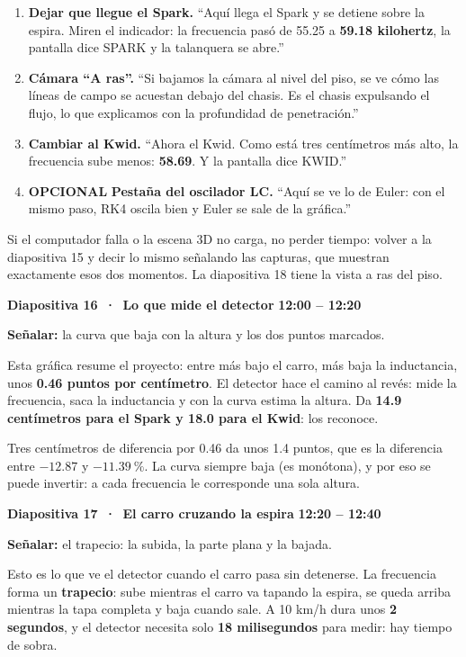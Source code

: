 \documentclass[11pt,a4paper]{article}
\newcommand{\diapo}[3]{%
  \par\vspace{8pt}
  {\large\bfseries Diapositiva #1 \,·\, #2}\hfill{\normalsize\bfseries\color{AzulIcesi} #3}\par
  \vspace{1pt}}
\newcommand{\senala}[1]{{\small\color{AzulIcesi}\textbf{Señalar:} #1}\par}
\begin{document}
\begin{enumerate}[leftmargin=1.4em, itemsep=3pt]
 \item \textbf{Dejar que llegue el Spark.} ``Aquí llega el Spark y se detiene sobre la espira. Miren el indicador:
       la frecuencia pasó de 55.25 a \textbf{59.18 kilohertz}, la pantalla dice SPARK y la talanquera se abre.''
 \item \textbf{Cámara ``A ras''.} ``Si bajamos la cámara al nivel del piso, se ve cómo las líneas de campo se
       acuestan debajo del chasis. Es el chasis expulsando el flujo, lo que explicamos con la profundidad de
       penetración.''
 \item \textbf{Cambiar al Kwid.} ``Ahora el Kwid. Como está tres centímetros más alto, la frecuencia sube menos:
       \textbf{58.69}. Y la pantalla dice KWID.''
 \item {\color{VerdeIcesi}\scriptsize\bfseries OPCIONAL} \textbf{Pestaña del oscilador LC.} ``Aquí se ve lo de
       Euler: con el mismo paso, RK4 oscila bien y Euler se sale de la gráfica.''
\end{enumerate}

\begin{nota}[Plan B]
Si el computador falla o la escena 3D no carga, no perder tiempo: volver a la diapositiva 15 y decir lo mismo
señalando las capturas, que muestran exactamente esos dos momentos. La diapositiva 18 tiene la vista a ras del piso.
\end{nota}

\diapo{16}{Lo que mide el detector}{12:00 -- 12:20}
\senala{la curva que baja con la altura y los dos puntos marcados.}

Esta gráfica resume el proyecto: entre más bajo el carro, más baja la inductancia, unos \textbf{0.46 puntos por
centímetro}. El detector hace el camino al revés: mide la frecuencia, saca la inductancia y con la curva estima la
altura. Da
\textbf{14.9 centímetros para el Spark y 18.0 para el Kwid}: los reconoce.

\begin{nota}
Tres centímetros de diferencia por 0.46 da unos 1.4 puntos, que es la diferencia entre $-12.87$ y $-11.39~\%$. La
curva siempre baja (es monótona), y por eso se puede invertir: a cada frecuencia le corresponde una sola altura.
\end{nota}

\diapo{17}{El carro cruzando la espira}{12:20 -- 12:40}
\senala{el trapecio: la subida, la parte plana y la bajada.}

Esto es lo que ve el detector cuando el carro pasa sin detenerse. La frecuencia forma un \textbf{trapecio}: sube
mientras el carro va tapando la espira, se queda arriba mientras la tapa completa y baja cuando sale. A 10 km/h dura
unos \textbf{2 segundos}, y el detector necesita solo \textbf{18 milisegundos} para medir: hay tiempo de sobra.
\end{document}
